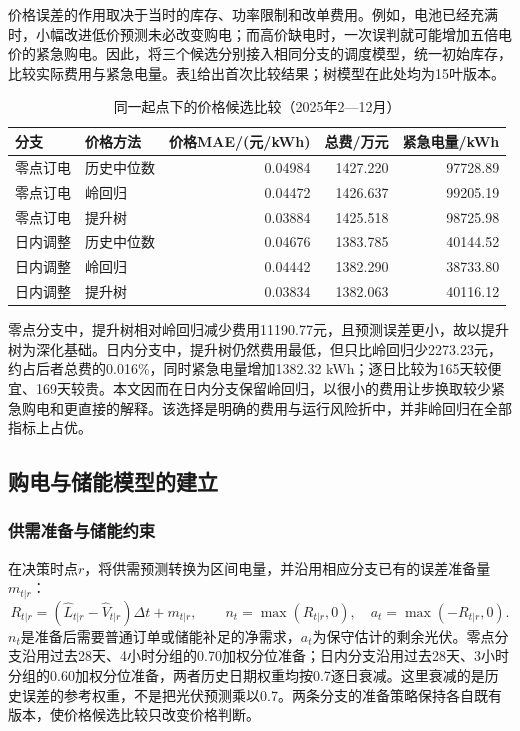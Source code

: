 \documentclass[11pt,a4paper]{article}
\begin{document}
价格误差的作用取决于当时的库存、功率限制和改单费用。例如，电池已经充满时，小幅改进低价预测未必改变购电；而高价缺电时，一次误判就可能增加五倍电价的紧急购电。因此，将三个候选分别接入相同分支的调度模型，统一初始库存，比较实际费用与紧急电量。表\ref{tab:candidates}给出首次比较结果；树模型在此处均为15叶版本。

\begin{table}[htbp]
\centering\small
\caption{同一起点下的价格候选比较（2025年2—12月）}
\label{tab:candidates}
\begin{tabular}{llrrr}
\toprule
分支 & 价格方法 & 价格MAE/(元/kWh) & 总费/万元 & 紧急电量/kWh \\
\midrule
零点订电 & 历史中位数 & 0.04984 & 1427.220 & 97728.89 \\
零点订电 & 岭回归 & 0.04472 & 1426.637 & 99205.19 \\
零点订电 & 提升树 & 0.03884 & 1425.518 & 98725.98 \\
日内调整 & 历史中位数 & 0.04676 & 1383.785 & 40144.52 \\
日内调整 & 岭回归 & 0.04442 & 1382.290 & 38733.80 \\
日内调整 & 提升树 & 0.03834 & 1382.063 & 40116.12 \\
\bottomrule
\end{tabular}
\end{table}

零点分支中，提升树相对岭回归减少费用11190.77元，且预测误差更小，故以提升树为深化基础。日内分支中，提升树仍然费用最低，但只比岭回归少2273.23元，约占后者总费的0.016\%，同时紧急电量增加1382.32 kWh；逐日比较为165天较便宜、169天较贵。本文因而在日内分支保留岭回归，以很小的费用让步换取较少紧急购电和更直接的解释。该选择是明确的费用与运行风险折中，并非岭回归在全部指标上占优。

\subsection{购电与储能模型的建立}

\subsubsection{供需准备与储能约束}

在决策时点$r$，将供需预测转换为区间电量，并沿用相应分支已有的误差准备量$m_{t|r}$：
\begin{equation}
 R_{t|r}=(\widehat L_{t|r}-\widehat V_{t|r})\Delta t+m_{t|r},\qquad
 n_t=\max(R_{t|r},0),\quad a_t=\max(-R_{t|r},0).
\end{equation}
$n_t$是准备后需要普通订单或储能补足的净需求，$a_t$为保守估计的剩余光伏。零点分支沿用过去28天、4小时分组的0.70加权分位准备；日内分支沿用过去28天、3小时分组的0.60加权分位准备，两者历史日期权重均按0.7逐日衰减。这里衰减的是历史误差的参考权重，不是把光伏预测乘以0.7。两条分支的准备策略保持各自既有版本，使价格候选比较只改变价格判断。
\end{document}
